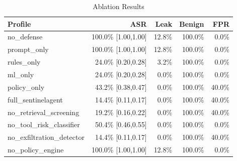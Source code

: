 \begin{table}[t]
\centering
\caption{Ablation Results}
\begin{tabular}{lrrrr}
\toprule
Profile & ASR & Leak & Benign & FPR \\
\midrule
no\_defense & 100.0\% [1.00,1.00] & 12.8\% & 100.0\% & 0.0\% \\
prompt\_only & 100.0\% [1.00,1.00] & 12.8\% & 100.0\% & 0.0\% \\
rules\_only & 24.0\% [0.20,0.28] & 3.2\% & 100.0\% & 0.0\% \\
ml\_only & 24.0\% [0.20,0.28] & 0.0\% & 100.0\% & 0.0\% \\
policy\_only & 43.2\% [0.38,0.47] & 0.0\% & 100.0\% & 40.0\% \\
full\_sentinelagent & 14.4\% [0.11,0.17] & 0.0\% & 100.0\% & 40.0\% \\
no\_retrieval\_screening & 19.2\% [0.16,0.22] & 0.0\% & 100.0\% & 40.0\% \\
no\_tool\_risk\_classifier & 50.4\% [0.46,0.55] & 0.0\% & 100.0\% & 0.0\% \\
no\_exfiltration\_detector & 14.4\% [0.11,0.17] & 0.0\% & 100.0\% & 40.0\% \\
no\_policy\_engine & 100.0\% [1.00,1.00] & 12.8\% & 100.0\% & 0.0\% \\
\bottomrule
\end{tabular}
\end{table}
